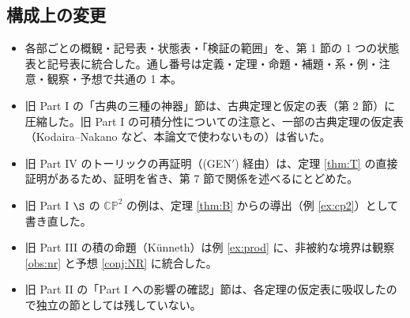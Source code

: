 \subsection{構成上の変更}
\begin{itemize}
\item 各部ごとの概観・記号表・状態表・「検証の範囲」を、第 1 節の 1 つの状態表と記号表に統合した。通し番号は定義・定理・命題・補題・系・例・注意・観察・予想で共通の 1 本。
\item 旧 Part I の「古典の三種の神器」節は、古典定理と仮定の表（第 2 節）に圧縮した。旧 Part I の可積分性についての注意と、一部の古典定理の仮定表（Kodaira--Nakano など、本論文で使わないもの）は省いた。
\item 旧 Part IV のトーリックの再証明（(GEN$'$) 経由）は、定理 \ref{thm:T} の直接証明があるため、証明を省き、第 7 節で関係を述べるにとどめた。
\item 旧 Part I $\S$ の $\mathbb{CP}^2$ の例は、定理 \ref{thm:B} からの導出（例 \ref{ex:cp2}）として書き直した。
\item 旧 Part III の積の命題（Künneth）は例 \ref{ex:prod} に、非被約な境界は観察 \ref{obs:nr} と予想 \ref{conj:NR} に統合した。
\item 旧 Part II の「Part I への影響の確認」節は、各定理の仮定表に吸収したので独立の節としては残していない。
\end{itemize}

